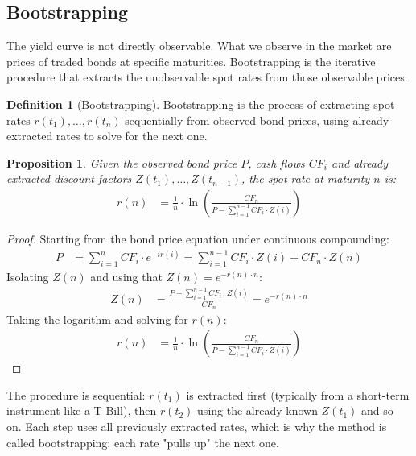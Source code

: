\documentclass{article}
\theoremstyle{definition}  %
\newtheorem{definition}{Definition}[section]
\theoremstyle{plain}  %
\newtheorem{proposition}{Proposition}[section]
\numberwithin{definition}{section}
\numberwithin{proposition}{section}
\numberwithin{theorem}{section}
\numberwithin{equation}{section}
\begin{document}
\subsection{Bootstrapping}
The yield curve is not directly observable. What we observe in the market are prices of traded bonds at specific maturities. Bootstrapping is the iterative procedure that extracts the unobservable spot rates from those observable prices.

\begin{definition}[Bootstrapping]
    Bootstrapping is the process of extracting spot rates $r(t_1), \dots, r(t_{n})$ sequentially from observed bond prices, using already extracted rates to solve for the next one.
\end{definition}

\begin{proposition}
    Given the observed bond price $P$, cash flows $CF_{i}$ and already extracted discount factors $Z(t_{1}), \dots, Z(t_{n - 1})$, the spot rate at maturity $n$ is:
    \begin{align*}
       r(n) &= \frac{1}{n} \cdot \ln \left(\frac{CF_n}{P - \sum_{i = 1}^{n-1} CF_{i} \cdot Z(i)} \right)
    \end{align*}
\end{proposition}

\begin{proof}
    Starting from the bond price equation under continuous compounding:
    \begin{align*}
        P &= \sum_{i = 1}^{n} CF_i \cdot e^{-i r(i)} = \sum_{i = 1}^{n - 1} CF_{i} \cdot Z(i) + CF_n \cdot Z(n)
    \end{align*}
    Isolating $Z(n)$ and using that $Z(n) = e^{- r(n) \cdot n}$:
    \begin{align*}
        Z(n) &= \frac{P - \sum_{i = 1}^{n - 1} CF_{i} \cdot Z(i)}{CF_n} = e^{-r(n) \cdot n}
    \end{align*}
    Taking the logarithm and solving for $r(n)$:
    \begin{align*}
        r(n) &= \frac{1}{n} \cdot \ln \left(\frac{CF_n}{P - \sum_{i = 1}^{n-1} CF_{i} \cdot Z(i)} \right)
    \end{align*}
\end{proof}
The procedure is sequential: $r(t_{1})$ is extracted first (typically from a short-term instrument like a T-Bill), then $r(t_{2})$ using the already known $Z(t_{1})$ and so on. Each step uses all previously extracted rates, which is why the method is called bootstrapping: each rate "pulls up" the next one.
\end{document}
